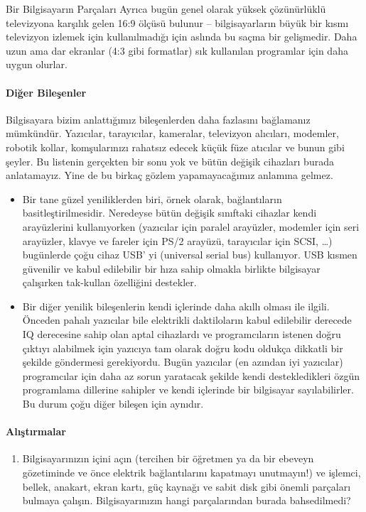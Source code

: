 \begin{section}{Bir Bilgisayarın Parçaları}
Ayrıca bugün genel olarak yüksek çözünürlüklü televizyona karşılık gelen 16:9 ölçüsü bulunur – bilgisayarların büyük bir kısmı televizyon izlemek için kullanılmadığı için aslında bu saçma bir gelişmedir. Daha uzun ama dar ekranlar (4:3 gibi formatlar) sık kullanılan programlar için daha uygun olurlar.
\paragraph{Diğer Bileşenler}{Bilgisayara bizim anlattığımız bileşenlerden daha fazlasını bağlamanız mümkündür. Yazıcılar, tarayıcılar, kameralar, televizyon alıcıları, modemler, robotik kollar, komşularınızı rahatsız edecek küçük füze atıcılar ve bunun gibi şeyler. Bu listenin gerçekten bir sonu yok ve bütün değişik cihazları burada anlatamayız. Yine de bu birkaç gözlem yapamayacağımız anlamına gelmez.}
\begin{itemize}
 \item Bir tane güzel yeniliklerden biri, örnek olarak, bağlantıların basitleştirilmesidir. Neredeyse bütün değişik sınıftaki cihazlar kendi arayüzlerini kullanıyorken (yazıcılar için paralel arayüzler, modemler için seri arayüzler, klavye ve fareler için PS/2 arayüzü, tarayıcılar için SCSI, …) bugünlerde çoğu cihaz USB' yi (universal serial bus) kullanıyor. USB kısmen güvenilir ve kabul edilebilir bir hıza sahip olmakla birlikte bilgisayar çalışırken tak-kullan özelliğini destekler.
 \item Bir diğer yenilik bileşenlerin kendi içlerinde daha akıllı olması ile ilgili. Önceden pahalı yazıcılar bile elektrikli daktiloların kabul edilebilir derecede IQ derecesine sahip olan aptal cihazlardı ve programcıların istenen doğru çıktıyı alabilmek için yazıcıya tam olarak doğru kodu oldukça dikkatli bir şekilde göndermesi gerekiyordu. Bugün yazıcılar (en azından iyi yazıcılar) programcılar için daha az sorun yaratacak şekilde kendi destekledikleri özgün programlama dillerine sahipler ve kendi içlerinde bir bilgisayar sayılabilirler. Bu durum çoğu diğer bileşen için aynıdır.
\end{itemize}
\paragraph{{\Huge{\PencilLeftDown}}Alıştırmalar}{
\begin{enumerate}
 \item Bilgisayarınızın içini açın (tercihen bir öğretmen ya da bir ebeveyn gözetiminde ve önce elektrik bağlantılarını kapatmayı unutmayın!) ve işlemci, bellek, anakart, ekran kartı, güç kaynağı ve sabit disk gibi önemli parçaları bulmaya çalışın. Bilgisayarınızın hangi parçalarından burada bahsedilmedi?
\end{enumerate}}
\end{section}

